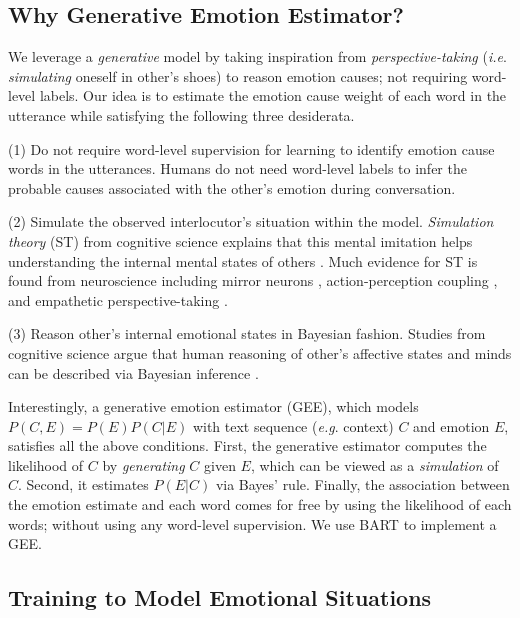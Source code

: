 \documentclass[11pt]{article}
\makeatletter
\DeclareRobustCommand\onedot{\futurelet\@let@token\@onedot}
\def\onedot{. }
\def\eg{\emph{e.g}\onedot} \def\Eg{\emph{E.g}\onedot}
\def\ie{\emph{i.e}\onedot} \def\Ie{\emph{I.e}\onedot}
\makeatother
\begin{document}
\subsection{Why Generative Emotion Estimator?}
\label{subsec:why_gee}
We leverage a \textit{generative} model by taking inspiration from \textit{perspective-taking} (\ie \textit{simulating} oneself in other's shoes) to reason emotion causes; not requiring word-level labels.
Our idea is to estimate the emotion cause weight of each word in the utterance while satisfying the following three desiderata.


(1) Do not require word-level supervision for learning to identify emotion cause words in the utterances.
Humans do not need word-level labels to infer the probable causes associated with the other's emotion during conversation.

(2) Simulate the observed interlocutor's situation within the model.
\textit{Simulation theory} (ST) from cognitive science explains that this mental imitation helps understanding the internal mental states of others \citep{Gallese:2004:TiCS}.
Much evidence for ST is found from neuroscience including mirror neurons \citep{Rizzolatti:2004:RevNeuro}, action-perception coupling \citep{Decety:2003:Neural}, and empathetic perspective-taking \citep{Ruby:2004:JCogNeuro}.


(3) Reason other's internal emotional states in Bayesian fashion.
Studies from cognitive science argue that human reasoning of other's affective states and minds can be described via Bayesian inference \citep{Griffiths:2008:Cambridge, Ong:2015:Cognition, Saxe:2017:Curr, Ong:2019:topics}.


Interestingly, a generative emotion estimator (GEE), which models $P(C,E) = P(E)P(C|E)$ with text sequence (\eg context) ${C}$ and emotion ${E}$, satisfies all the above conditions.
First, the generative estimator computes the likelihood of $C$ by \textit{generating} $C$ given $E$, which can be viewed as a \textit{simulation} of $C$.
Second, it estimates $P(E|C)$ via Bayes' rule.
Finally, the association between the emotion estimate and each word comes for free by using the likelihood of each words; without using any word-level supervision.
We use BART \citep{Lewis:2020:ACL} to implement a GEE. 



\subsection{Training to Model Emotional Situations}
\label{subsec:train_gee}
\end{document}
